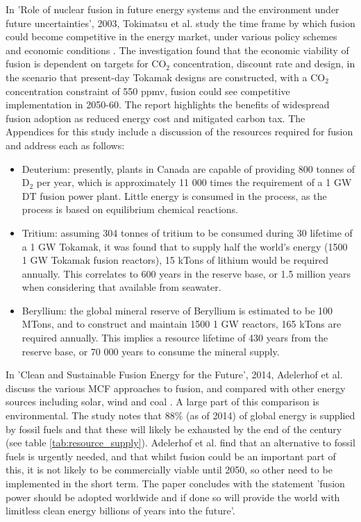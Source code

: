 In 'Role of nuclear fusion in future energy systems and the environment under future uncertainties', 2003, Tokimatsu et al. study the time frame by which fusion could become competitive in the energy market, under various policy schemes and economic conditions \cite{tokimatsu2003role}. The investigation found that the economic viability of fusion is dependent on targets for CO$_2$ concentration, discount rate and design, in the scenario that present-day Tokamak designs are constructed, with a CO$_2$ concentration constraint  of 550 ppmv, fusion could see competitive implementation in 2050-60.  The report highlights the benefits of widespread fusion adoption as reduced energy cost and mitigated carbon tax.
The Appendices for this study include a discussion of the resources required for fusion and address each as follows:
\begin{itemize}
    \item Deuterium: presently, plants in Canada are capable of providing 800 tonnes of D$_2$ per year, which is approximately 11 000 times the requirement of a 1 GW DT fusion power plant. Little energy is consumed in the process, as the process is based on equilibrium chemical reactions.
    \item Tritium: assuming 304 tonnes of tritium to be consumed during 30 lifetime of a 1 GW Tokamak, it was found that to supply half the world's energy (1500 1 GW Tokamak fusion reactors), 15 kTons of lithium would be required annually. This correlates to 600 years in the reserve base, or 1.5 million years when considering that available from seawater.
    \item Beryllium: the global mineral reserve of Beryllium is estimated to be 100 MTons, and to construct and maintain 1500 1 GW reactors, 165 kTons are required annually. This implies a resource lifetime of 430 years from the reserve base, or 70 000 years to consume the mineral supply.
\end{itemize}

In 'Clean and Sustainable Fusion Energy for the Future', 2014, Adelerhof et al. discuss the various MCF approaches to fusion, and compared with other energy sources including solar, wind and coal \cite{adelerhof2014clean}. A large part of this comparison is environmental. The study notes that 88\% (as of 2014) of global energy is supplied by fossil fuels and that these will likely be exhausted by the end of the century (see table \ref{tab:resource_supply}). Adelerhof et al. find that an alternative to fossil fuels is urgently needed, and that whilst fusion could be an important part of this, it is not likely to be commercially viable until 2050, so other need to be implemented in the short term. The paper concludes with the statement 'fusion power should be adopted worldwide and if done so will provide the world with limitless clean energy billions of years into the future'. 

